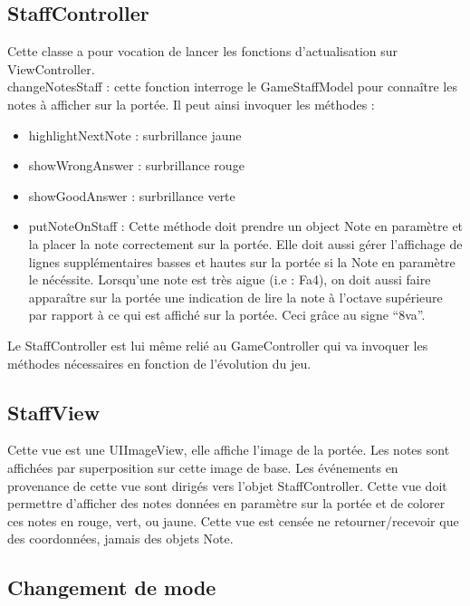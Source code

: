 \documentclass{scrreprt}
\begin{document}
\subsection{StaffController}

Cette classe a pour vocation de lancer les fonctions d’actualisation sur ViewController.\\
changeNotesStaff : cette fonction interroge le GameStaffModel pour connaître les notes à afficher sur la portée. Il peut ainsi invoquer les méthodes : 
\begin{itemize}
\item highlightNextNote : surbrillance jaune
\item showWrongAnswer : surbrillance rouge
\item showGoodAnswer : surbrillance verte
\item putNoteOnStaff : Cette méthode doit prendre un object Note en paramètre et la placer la note correctement sur la portée. 
Elle doit aussi gérer l'affichage de lignes supplémentaires basses et hautes sur la portée si la Note en paramètre le nécéssite. 
Lorsqu'une note est très aigue (i.e : Fa4), on doit aussi faire apparaître sur la portée une indication de lire la note à l'octave supérieure par rapport à ce qui est affiché sur la portée. Ceci grâce au signe \enquote{8va}.
\end{itemize}

Le StaffController est lui même relié au GameController qui va invoquer les méthodes nécessaires en fonction de l’évolution du jeu.

\subsection{StaffView}

Cette vue est une UIImageView, elle affiche l’image de la portée. Les notes sont affichées par superposition sur cette image de base. Les événements en provenance de cette vue sont dirigés vers l’objet StaffController.
Cette vue doit permettre d’afficher des notes données en paramètre sur la portée et de colorer ces notes en rouge, vert, ou jaune. Cette vue est censée ne retourner/recevoir que des coordonnées, jamais des objets Note.

\subsection{Changement de mode}
\end{document}
